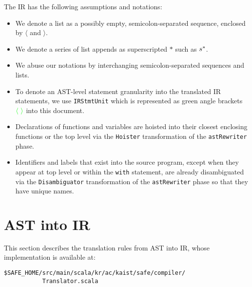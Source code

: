 The \safe IR has the following assumptions and notations:
\begin{itemize}
\item We denote a list as a possibly empty, semicolon-separated sequence, enclosed by $\langle$ and $\rangle$.
\item We denote a series of list appends as superscripted $*$ such as $s^*$.
\item We abuse our notations by interchanging semicolon-separated sequences and lists.
\item To denote an AST-level statement granularity into the translated IR statements,
we use {\tt IRStmtUnit} which is represented as green angle brackets {\ingreen ${\color{green}\langle}\ {\color{green}\rangle}$} into this document.
\item Declarations of functions and variables are hoisted into their closest enclosing functions
or the top level via the \verb!Hoister! transformation of the \verb!astRewriter! phase.
\item Identifiers and labels that exist into the source program,
except when they appear at top level or within the {\tt with} statement,
are already disambiguated via the \verb!Disambiguator! transformation of the \verb!astRewriter! phase
so that they have unique names.
\end{itemize}

\section{AST into IR}
This section describes the \safe translation rules from AST into IR,
whose implementation is available at:
\begin{verbatim}
$SAFE_HOME/src/main/scala/kr/ac/kaist/safe/compiler/
           Translator.scala
\end{verbatim}

